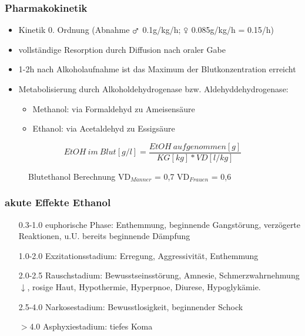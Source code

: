 \documentclass[10pt,a4paper]{report}
\begin{document}
\subsubsection{Pharmakokinetik} %
\label{ssub:pharmakokinetik}
\begin{itemize}
	\item Kinetik 0. Ordnung (Abnahme $\mars$ 0.1g/kg/h; $\venus$ 0.085g/kg/h = 0.15\textperthousand/h)
	\item vollständige Resorption durch Diffusion nach oraler Gabe
	\item 1-2h nach Alkoholaufnahme ist das Maximum der Blutkonzentration erreicht
	\item Metabolisierung durch Alkoholdehydrogenase bzw. Aldehyddehydrogenase:	
	\begin{itemize}
	 	\item Methanol: via Formaldehyd zu Ameisensäure
		\item Ethanol: via Acetaldehyd zu Essigsäure
	 \end{itemize} 
\end{itemize}
\begin{figure}
\begin{equation}
	EtOH\:im\:Blut[g/l]=\frac{EtOH\:aufgenommen[g]}{KG[kg]*VD[l/kg]}
\end{equation}
\caption{Blutethanol Berechnung VD$_{M\ddot{a}nner}$ = 0,7 VD$_{Frauen}$ = 0,6}
\end{figure}
\subsubsection{akute Effekte Ethanol} %
\label{ssub:akute_effekte_ethanol}
\begin{itemize}
	\item[0.3-1.0\textperthousand] euphorische Phase: Enthemmung, beginnende Gangstörung, verzögerte Reaktionen, u.U. bereits beginnende Dämpfung 
	\item[1.0-2.0\textperthousand] Exzitationsstadium: Erregung, Aggressivität, Enthemmung
	\item [2.0-2.5\textperthousand]  Rauschstadium: Bewusstseinsstörung, Amnesie, Schmerzwahrnehmung$\downarrow$, rosige Haut, Hypothermie, Hyperpnoe, Diurese, Hypoglykämie.
	\item[2.5-4.0\textperthousand]  Narkosestadium: Bewusstlosigkeit, beginnender Schock
	\item[$>$4.0\textperthousand] Asphyxiestadium: tiefes Koma
\end{itemize}
\end{document}
